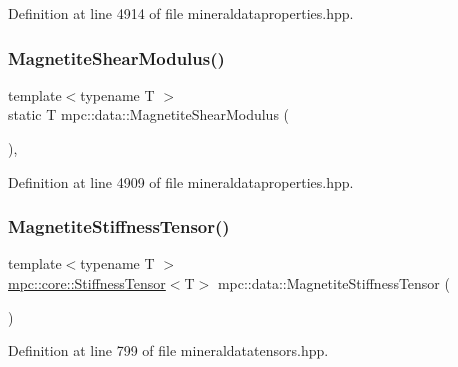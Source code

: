 Definition at line 4914 of file mineraldataproperties.\+hpp.

\mbox{\label{namespacempc_1_1data_a7d7cc807c02b4ebc2867c6877743f2eb}} 
\subsubsection{\texorpdfstring{Magnetite\+Shear\+Modulus()}{MagnetiteShearModulus()}}
{\footnotesize\ttfamily template$<$typename T $>$ \\
static T mpc\+::data\+::\+Magnetite\+Shear\+Modulus (\begin{DoxyParamCaption}{ }\end{DoxyParamCaption})\hspace{0.3cm}{\ttfamily [inline]}, {\ttfamily [static]}}



Definition at line 4909 of file mineraldataproperties.\+hpp.

\mbox{\label{namespacempc_1_1data_a828c1129601d11df8b7011f0423b1aab}} 
\subsubsection{\texorpdfstring{Magnetite\+Stiffness\+Tensor()}{MagnetiteStiffnessTensor()}}
{\footnotesize\ttfamily template$<$typename T $>$ \\
\mbox{\hyperlink{structmpc_1_1core_1_1_stiffness_tensor}{mpc\+::core\+::\+Stiffness\+Tensor}}$<$T$>$ mpc\+::data\+::\+Magnetite\+Stiffness\+Tensor (\begin{DoxyParamCaption}{ }\end{DoxyParamCaption})}



Definition at line 799 of file mineraldatatensors.\+hpp.

\mbox{\label{namespacempc_1_1data_afa0245caf4809ff285c3e71704b31a22}} 
